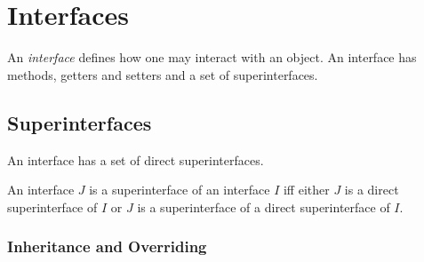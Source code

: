 \documentclass{article}
\begin{document}











\section{Interfaces}

\LMHash{}
An {\em interface} defines how one may interact with an object. An interface has methods, getters and setters and a set of superinterfaces.

\subsection{Superinterfaces}

\LMHash{}
An interface has a set of direct superinterfaces.

\LMHash{}
An interface $J$ is a superinterface of an interface $I$ iff either $J$ is a direct superinterface of $I$ or $J$ is a superinterface of a direct superinterface of $I$.




\subsubsection{Inheritance and Overriding}
\end{document}
